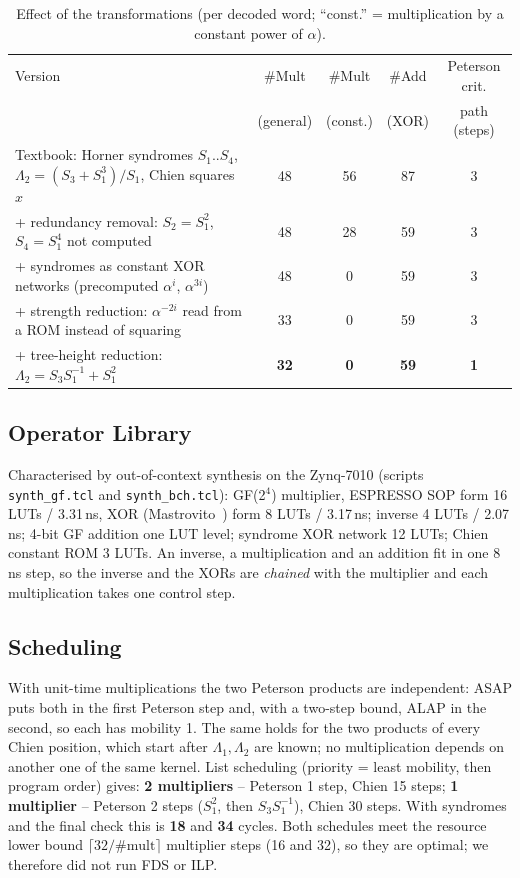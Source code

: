 \documentclass[11pt,a4paper]{article}
\begin{document}
\begin{table}[H]\centering\small
\caption{Effect of the transformations (per decoded word; ``const.'' = multiplication by a constant power of $\alpha$).}\label{tab:transform}
\begin{tabularx}{\linewidth}{@{}Xcccc@{}}
\toprule
Version & \#Mult & \#Mult & \#Add & Peterson crit.\\
 & (general) & (const.) & (XOR) & path (steps)\\
\midrule
Textbook: Horner syndromes $S_1..S_4$, $\Lambda_2=(S_3+S_1^3)/S_1$, Chien squares $x$ & 48 & 56 & 87 & 3\\
+ redundancy removal: $S_2=S_1^2$, $S_4=S_1^4$ not computed & 48 & 28 & 59 & 3\\
+ syndromes as constant XOR networks (precomputed $\alpha^{i}$, $\alpha^{3i}$) & 48 & 0 & 59 & 3\\
+ strength reduction: $\alpha^{-2i}$ read from a ROM instead of squaring & 33 & 0 & 59 & 3\\
+ tree-height reduction: $\Lambda_2 = S_3S_1^{-1}+S_1^2$ & \textbf{32} & \textbf{0} & \textbf{59} & \textbf{1}\\
\bottomrule
\end{tabularx}
\end{table}

\subsection{Operator Library}
Characterised by out-of-context synthesis on the Zynq-7010 (scripts \texttt{synth\_gf.tcl} and
\texttt{synth\_bch.tcl}): GF(2$^4$) multiplier, ESPRESSO SOP form 16 LUTs / 3.31\,ns, XOR (Mastrovito~\cite{mastrovito88}) form
8 LUTs / 3.17\,ns; inverse 4 LUTs / 2.07\,ns; 4-bit GF addition one LUT level; syndrome XOR network
12 LUTs; Chien constant ROM 3 LUTs. An inverse, a multiplication and an addition fit in one 8\,ns
step, so the inverse and the XORs are \emph{chained} with the multiplier and each multiplication takes
one control step.

\subsection{Scheduling}
With unit-time multiplications the two Peterson products are independent: ASAP puts both in the first
Peterson step and, with a two-step bound, ALAP in the second, so each has mobility 1. The same holds for
the two products of every Chien position, which start after $\Lambda_1,\Lambda_2$ are known; no
multiplication depends on another one of the same kernel. List scheduling (priority = least mobility, then program
order) gives: \textbf{2 multipliers} -- Peterson 1 step, Chien 15 steps; \textbf{1 multiplier} -- Peterson
2 steps ($S_1^2$, then $S_3S_1^{-1}$), Chien 30 steps. With syndromes and the final check this is
\textbf{18} and \textbf{34} cycles. Both schedules meet the resource lower bound
$\lceil 32/\#\text{mult}\rceil$ multiplier steps (16 and 32), so they are optimal; we therefore did not
run FDS or ILP.
\end{document}
